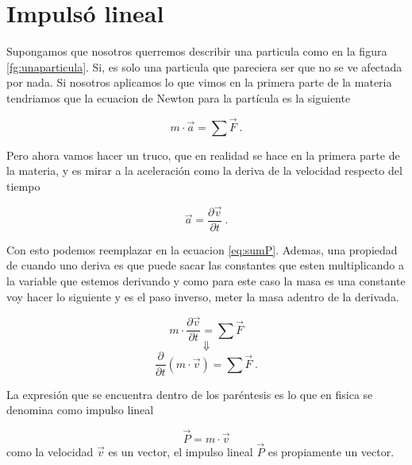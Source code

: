 \documentclass[../Main.tex]{subfiles}
\begin{document}
{
    \section{Impulsó lineal}

    Supongamos que nosotros querremos describir una particula como en la 
    figura \ref{fg:unaparticula}. Si, es solo una particula que pareciera ser
    que no se ve afectada por nada. Si nosotros aplicamos lo que vimos en la
    primera parte de la materia tendriamos que la ecuacion de Newton para la
    partícula es la siguiente

    \begin{equation}
        m \cdot \vec{a} = \sum \vec{F} \ .
        \label{eq:sumP}
    \end{equation}

    Pero ahora vamos hacer un truco, que en realidad se hace en la primera parte de 
    la materia, y es mirar a la aceleración como la deriva de la velocidad respecto
    del tiempo

    \begin{equation}
        \vec{a} = \frac{\partial \vec{v}}{\partial t} \ .
    \end{equation}

    Con esto podemos reemplazar en la ecuacion \ref{eq:sumP}. Ademas, una propiedad
    de cuando uno deriva es que puede sacar las constantes que esten multiplicando
    a la variable que estemos derivando y como para este caso la masa es una
    constante voy hacer lo siguiente y es el paso inverso, meter la masa adentro de
    la derivada.

    \begin{equation}
        m \cdot \frac{\partial \vec{v}}{\partial t} = \sum \vec{F}
    \end{equation}
    \begin{equation*}
        \Downarrow
    \end{equation*}
    \begin{equation*}
        \frac{\partial}{\partial t} \left( m \cdot \vec{v} \right) = \sum \vec{F} \ .
    \end{equation*}

    La expresión que se encuentra dentro de los paréntesis es lo que en fisica se 
    denomina como impulso lineal

    \begin{equation}
        \vec{P} = m \cdot \vec{v}
        \label{eq:impLineal}
    \end{equation}
    como la velocidad $\vec{v}$ es un vector, el impulso lineal $\vec{P}$ es
    propiamente un vector.

}
\end{document}
